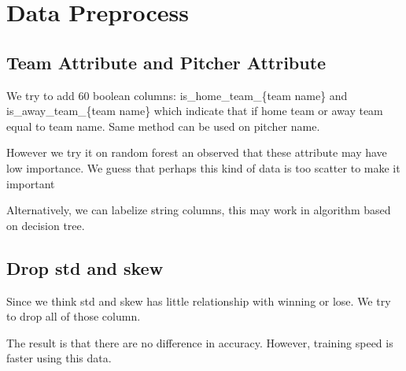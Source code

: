 \section{Data Preprocess}

\subsection*{Team Attribute and Pitcher Attribute}
\par We try to add 60 boolean columns: is\_home\_team\_\{team name\} and is\_away\_team\_\{team name\} which indicate that if home team or away team equal to team name. Same method can be used on pitcher name. 
\par However we try it on random forest an observed that these attribute may have low importance. We guess that perhaps this kind of data is too scatter to make it important
\par Alternatively, we can labelize string columns, this may work in algorithm based on decision tree.

\subsection*{Drop std and skew}
\par Since we think std and skew has little relationship with winning or lose. We try to drop all of those column.
\par The result is that there are no difference in accuracy. However, training speed is faster using this data.


